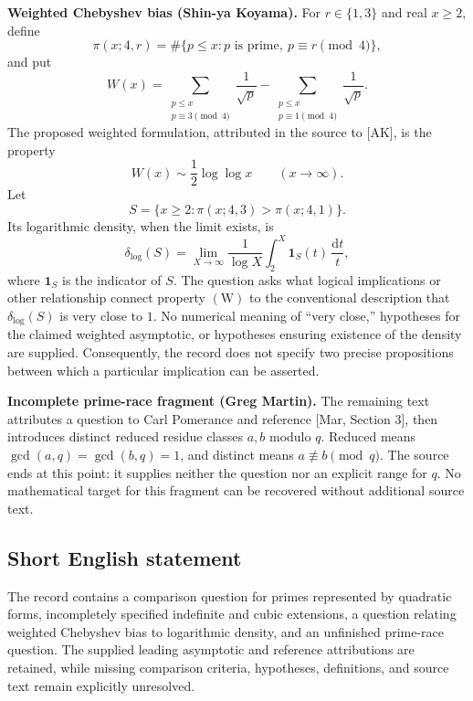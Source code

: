 \documentclass[11pt]{article}
\begin{document}
\textbf{Weighted Chebyshev bias (Shin-ya Koyama).}
For \(r\in\{1,3\}\) and real \(x\ge2\), define
\[
\pi(x;4,r)=\#\{p\le x:p\text{ is prime},\ p\equiv r\pmod4\},
\]
and put
\[
W(x)=\sum_{\substack{p\le x\\p\equiv3\!\!\!\pmod4}}\frac1{\sqrt p}
-\sum_{\substack{p\le x\\p\equiv1\!\!\!\pmod4}}\frac1{\sqrt p}.
\]
The proposed weighted formulation, attributed in the source to [AK], is the property
\[
W(x)\sim\frac12\log\log x\qquad(x\to\infty).
\tag{W}
\]
Let
\[
S=\{x\ge2:\pi(x;4,3)>\pi(x;4,1)\}.
\]
Its logarithmic density, when the limit exists, is
\[
\delta_{\log}(S)=\lim_{X\to\infty}\frac1{\log X}\int_2^X\mathbf1_S(t)\,\frac{\mathrm dt}{t},
\]
where \(\mathbf1_S\) is the indicator of \(S\). The question asks what logical implications or other relationship connect property \((\mathrm W)\) to the conventional description that \(\delta_{\log}(S)\) is very close to \(1\). No numerical meaning of ``very close,'' hypotheses for the claimed weighted asymptotic, or hypotheses ensuring existence of the density are supplied. Consequently, the record does not specify two precise propositions between which a particular implication can be asserted.

\textbf{Incomplete prime-race fragment (Greg Martin).}
The remaining text attributes a question to Carl Pomerance and reference [Mar, Section 3], then introduces distinct reduced residue classes \(a,b\) modulo \(q\). Reduced means \(\gcd(a,q)=\gcd(b,q)=1\), and distinct means \(a\not\equiv b\pmod q\). The source ends at this point: it supplies neither the question nor an explicit range for \(q\). No mathematical target for this fragment can be recovered without additional source text.
\subsection{Short English statement}
The record contains a comparison question for primes represented by quadratic forms, incompletely specified indefinite and cubic extensions, a question relating weighted Chebyshev bias to logarithmic density, and an unfinished prime-race question. The supplied leading asymptotic and reference attributions are retained, while missing comparison criteria, hypotheses, definitions, and source text remain explicitly unresolved.
\end{document}
